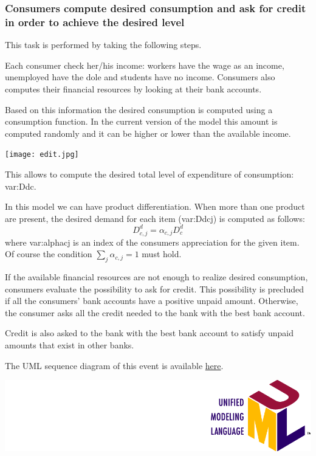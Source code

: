 \documentclass{book}
\newcommand{\doclocation}{file:///Users/giulioni/Documents/workspace/gabriele/docs}
\begin{document}
\subsubsection{Consumers compute desired consumption and ask for credit in order to achieve the desired level}
This task is performed by taking the following steps.

Each consumer check her/his income: workers have the wage as an income, unemployed have the dole and students have no income. Consumers also computes their financial resources by looking at their bank accounts. 

Based on this information the desired consumption is computed using a consumption function. In the current version of the model this amount is computed randomly and it can be higher or lower than the available income. 
\begin{marginfigure}
	\hskip2.5cm\texttt{[image: edit.jpg]}
\end{marginfigure}


This allows to compute the desired total level of expenditure of consumption: \gls{var:Ddc}.

In this model we can have product differentiation. When more than one product are present, the desired demand for each item (\gls{var:Ddcj}) is computed as follows:
\[
	D_{c,j}^d=\alpha_{c,j}D^d_{c}
\]
where \gls{var:alphacj} is an index of the consumers appreciation for the given item. Of course the condition $\sum_j \alpha_{c,j}=1$ must hold.

If the available financial resources are not enough to realize desired consumption, consumers evaluate the possibility to ask for credit. This possibility is precluded if all the consumers' bank accounts have a positive unpaid amount. Otherwise, the consumer asks all the credit needed to the bank with the best bank account. 

Credit is also asked to the bank with the best bank account to satisfy unpaid amounts that exist in other banks. 


The UML sequence diagram of this event is available \href{\doclocation/umldoc/stepDesiredConsumption.html}{here}.
\begin{marginfigure}
	\includegraphics[scale=0.1]{uml.png}
\end{marginfigure}
\end{document}
